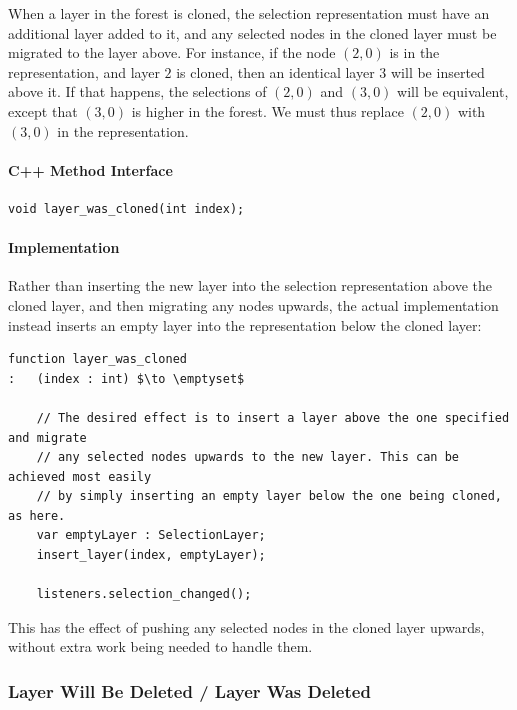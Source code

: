 When a layer in the forest is cloned, the selection representation must have an additional layer added to it, and any selected nodes in the cloned layer must be migrated to the layer above. For instance, if the node $(2,0)$ is in the representation, and layer $2$ is cloned, then an identical layer $3$ will be inserted above it. If that happens, the selections of $(2,0)$ and $(3,0)$ will be equivalent, except that $(3,0)$ is higher in the forest. We must thus replace $(2,0)$ with $(3,0)$ in the representation.

\paragraph{C++ Method Interface}

\begin{lstlisting}[style=Prototype]
void layer_was_cloned(int index);
\end{lstlisting}

\paragraph{Implementation}

Rather than inserting the new layer into the selection representation above the cloned layer, and then migrating any nodes upwards, the actual implementation instead inserts an empty layer into the representation below the cloned layer:

\begin{lstlisting}[style=Default]
function layer_was_cloned
:	(index : int) $\to \emptyset$

	// The desired effect is to insert a layer above the one specified and migrate
	// any selected nodes upwards to the new layer. This can be achieved most easily
	// by simply inserting an empty layer below the one being cloned, as here.
	var emptyLayer : SelectionLayer;
	insert_layer(index, emptyLayer);

	listeners.selection_changed();
\end{lstlisting}

\noindent This has the effect of pushing any selected nodes in the cloned layer upwards, without extra work being needed to handle them.

\newpage

\subsubsection{Layer Will Be Deleted / Layer Was Deleted}

